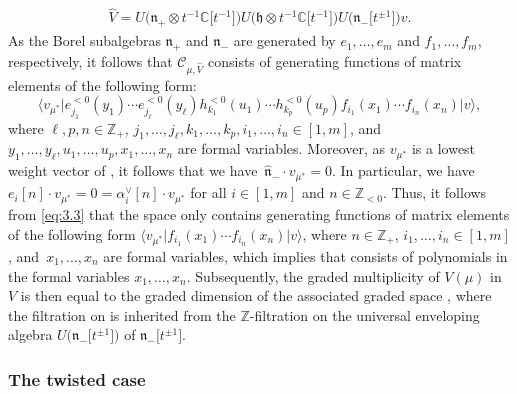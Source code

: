 \documentclass[10pt,a4paper]{amsart}
\numberwithin{equation}{section}
\DeclareMathOperator{\gr}{gr}
\begin{document}
\begin{gather*}
\widehat{V}=U\bigl(\mathfrak{n}_+\otimes t^{-1}\mathbb{C}\bigl[t^{-1}\bigr]\bigr)U\bigl(\mathfrak{h}\otimes t^{-1}\mathbb{C}\bigl[t^{-1}\bigr]\bigr)U\bigl(\mathfrak{n}_-\bigl[t^{\pm1}\bigr]\bigr)v.
\end{gather*}
As the Borel subalgebras $\mathfrak{n}_+$ and $\mathfrak{n}_-$ are generated by $e_1,\dots,e_m$ and $f_1,\dots,f_m$, respectively, it follows that $\mathcal{C}_{ \mu,\widehat{V}}$ consists of generating functions of matrix elements of the following form:
\begin{equation}
\big\langle v_{\mu^*}\big|e_{j_1}^{<0}(y_1)\cdots e_{j_{\ell}}^{<0}(y_{\ell})h_{k_1}^{<0}(u_1)\cdots h_{k_p}^{<0}(u_p)f_{i_1}(x_1)\cdots f_{i_n}(x_n)\big|v\big\rangle,\label{eq:3.3}
\end{equation}
where $\ell,p,n\in\mathbb{Z}_+$, $j_1,\dots,j_{\ell},k_1, \dots,k_p,i_1,\dots,i_n\in[1,m]$, and $y_1,\dots,y_{\ell}, u_1,\dots,u_p,x_1,\dots,x_n$ are formal variables. Moreover, as $v_{\mu^*}$ is a lowest weight vector of , it follows that we have~${\widehat{\mathfrak{n}}_-\cdot v_{\mu^*}=0}$. In particular, we have $e_i[n]\cdot v_{\mu^*}=0=\alpha_i^{\vee}[n]\cdot v_{\mu^*}$ for all $i\in[1,m]$ and $n\in\mathbb{Z}_{<0}$. Thus, it follows from \eqref{eq:3.3} that the space  only contains generating functions of matrix elements of the following form
$
\langle v_{\mu^*}\big|f_{i_1}(x_1)\cdots f_{i_n}(x_n)\big|v\rangle$,
where $n\in\mathbb{Z}_+$, $i_1,\dots,i_n\in[1,m]$, and~${x_1, \dots,x_n}$ are formal variables, which implies that  consists of polynomials in the formal variables $x_1, \dots,x_n$. Subsequently, the graded multiplicity of $V({\mu})$ in $V$ is then equal to the graded dimension of the associated graded space \smash{$\gr\mathcal{C}_{\mu,\widehat{V}}$}, where the filtration on  is inherited from the $\mathbb{Z}$-filtration on the universal enveloping algebra $U\bigl(\mathfrak{n}_-\bigl[t^{\pm1}\bigr]\bigr)$ of $\mathfrak{n}_-\bigl[t^{\pm1}\bigr]$.

\subsubsection{The twisted case}\label{Section 3.1.2}
\end{document}

